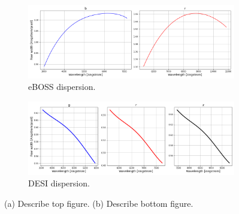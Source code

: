 \begin{figure}[h]
\centering
\begin{subfigure}[b]{0.55\textwidth}
   \includegraphics[width=14cm]{images/specsim/eboss_row_width.png}
   \caption{eBOSS dispersion.}
   \label{fig:eboss_disp} 
\end{subfigure}

\begin{subfigure}[b]{0.55\textwidth}
   \includegraphics[width=14cm]{images/specsim/desi_row_width.png}
   \caption{DESI dispersion.}
   \label{fig:desi_disp}
\end{subfigure}
\caption[Two numerical solutions]{(a) Describe top figure. (b) Describe bottom figure.}
\end{figure}



